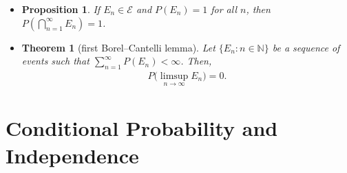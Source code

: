 \documentclass[10pt]{article}
\newtheorem{theorem}[lemma]{Theorem}
\newtheorem{proposition}[lemma]{Proposition}
\numberwithin{lemma}{section}
\newcommand{\mcal}[1]{\mathcal{#1}}
\newcommand{\Nat}{\mathbb{N}}
\begin{document}
\begin{itemize}
  \item \begin{proposition}
    If $E_n \in \mcal{E}$ and $P(E_n) = 1$ for all $n$, then $P(\bigcap_{n=1}^\infty E_n) = 1$.
  \end{proposition}

  \item \begin{theorem}[first Borel--Cantelli lemma]
    Let $\{ E_n : n \in \Nat \}$ be a sequence of events such that $\sum_{n = 1}^\infty P(E_n) < \infty$. Then,
    \begin{align*}
      P\bigg( \limsup_{n \rightarrow \infty} E_n \bigg) = 0. 
    \end{align*}
  \end{theorem}
\end{itemize}

\section{Conditional Probability and Independence} \label{sec:conditional-prob}
\end{document}
